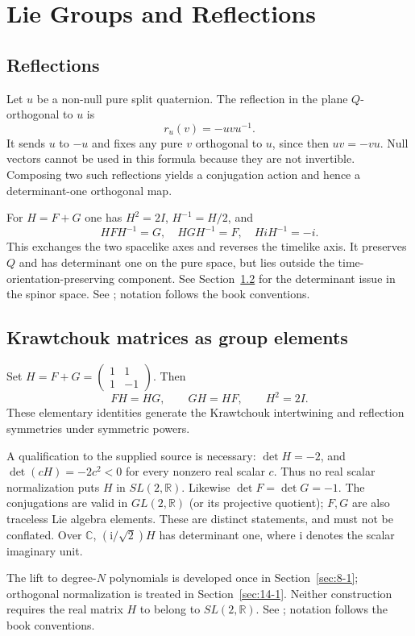 \chapter{Lie Groups and Reflections}
\label{ch:7}
\section{Reflections}
\label{sec:7-1}
Let $u$ be a non-null pure split quaternion. The reflection in the
plane $Q$-orthogonal to $u$ is
\[
r_u(v)=-uvu^{-1}.
\]
It sends $u$ to $-u$ and fixes any pure $v$ orthogonal to $u$, since
then $uv=-vu$. Null vectors cannot be used in this formula because
they are not invertible. Composing two such reflections yields a
conjugation action and hence a determinant-one orthogonal map.

For $H=F+G$ one has $H^2=2I$, $H^{-1}=H/2$, and
\[
HFH^{-1}=G,\quad HGH^{-1}=F,\quad HiH^{-1}=-i.
\]
This exchanges the two spacelike axes and reverses the timelike axis.
It preserves $Q$ and has determinant one on the pure space, but lies
outside the time-orientation-preserving component.
See Section~\ref{sec:7-2} for the determinant issue in the spinor space.
See \cite[Section~7]{KocikFeynman}; notation follows the book conventions.

\section{Krawtchouk matrices as group elements}
\label{sec:7-2}
Set $H=F+G=\begin{pmatrix}1&1\\1&-1\end{pmatrix}$. Then
\[
FH=HG,\qquad GH=HF,\qquad H^2=2I.
\]
These elementary identities generate the Krawtchouk intertwining and
reflection symmetries under symmetric powers.

A qualification to the supplied source is necessary:
$\det H=-2$, and $\det(cH)=-2c^2<0$ for every nonzero real scalar $c$.
Thus no real scalar normalization puts $H$ in $SL(2,\mathbb R)$.
Likewise $\det F=\det G=-1$.
The conjugations are valid in $GL(2,\mathbb R)$ (or its projective
quotient); $F,G$ are also traceless Lie algebra elements. These are
distinct statements, and must not be conflated.
Over $\mathbb C$, $(\mathrm{i}/\sqrt2)H$ has determinant one, where
$\mathrm{i}$ denotes the scalar imaginary unit.

The lift to degree-$N$ polynomials is developed once in
Section~\ref{sec:8-1}; orthogonal normalization is treated in
Section~\ref{sec:14-1}. Neither construction requires the real matrix
$H$ to belong to $SL(2,\mathbb R)$.
See \cite[Section~7]{KocikFeynman}; notation follows the book conventions.


